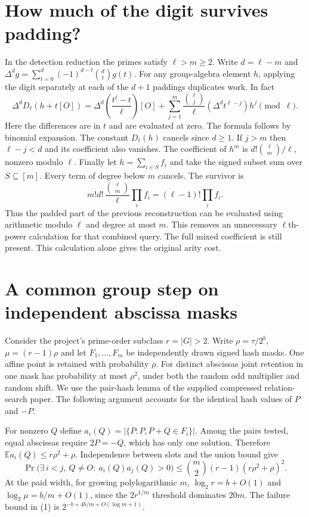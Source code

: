 \documentclass[11pt]{article}
\begin{document}
\section{How much of the digit survives padding?}
In the detection reduction the primes satisfy $\ell>m\ge2$. Write
$d=\ell-m$ and $\Delta^d g=\sum_{t=0}^d(-1)^{d-t}\binom dt g(t)$.
For any group-algebra element $h$, applying the digit separately
at each of the $d+1$ paddings duplicates work. In fact
\[
\Delta^d D_\ell(h+t[O])
 = \Delta^d\!\left(\frac{t^\ell-t}{\ell}\right)[O]
   +\sum_{j=1}^m \frac{\binom{\ell}{j}}{\ell}
                    (\Delta^d t^{\ell-j})h^j \pmod\ell .
\]
Here the differences are in $t$ and are evaluated at zero. The formula
follows by binomial expansion. The constant $D_\ell(h)$ cancels since
$d\ge1$. If $j>m$ then $\ell-j<d$ and its coefficient also vanishes.
The coefficient of $h^m$ is $d!\binom{\ell}{m}/\ell$, nonzero
modulo $\ell$. Finally let $h=\sum_{i\in S}f_i$ and take the signed
subset sum over $S\subseteq[m]$. Every term of degree below $m$
cancels. The survivor is
\[
   m!d!\,\frac{\binom{\ell}{m}}{\ell}\prod_i f_i
                       =(\ell-1)!\prod_i f_i .
\]
Thus the padded part of the previous reconstruction can be evaluated using
arithmetic modulo $\ell$ and degree at most $m$. This removes an
unnecessary $\ell$th-power calculation for that combined query. The
full mixed coefficient is still present. This calculation alone gives
the original arity cost.

\section{A common group step on independent abscissa masks}
Consider the project's prime-order subclass $r=|G|>2$. Write
$\rho=\tau/2^b$, $\mu=(r-1)\rho$ and let $F_1,\dots,F_m$ be
independently drawn signed hash masks. One affine point is retained
with probability $\rho$. For distinct abscissas joint retention in
one mask has probability at most $\rho^2$, under both the random
odd multiplier and random shift. We use the pair-hash lemma of the
supplied compressed relation-search paper. The following argument
accounts for the identical hash values of $P$ and $-P$.

For nonzero $Q$ define $a_i(Q)=|\{P:P,P+Q\in F_i\}|$. Among
the pairs tested, equal abscissas require $2P=-Q$, which has only
one solution. Therefore $\mathbb E a_i(Q)\le r\rho^2+\rho$.
Independence between slots and the union bound give
\[
 \Pr\big(\exists\,i<j,\ Q\ne O:\ a_i(Q)a_j(Q)>0\big)
       \le \binom{m}{2}(r-1)(r\rho^2+\rho)^2 .                 \tag{1}
\]
At the paid width, for growing polylogarithmic $m$,
$\log_2 r=b+O(1)$ and $\log_2\mu=b/m+O(1)$, since the $2r^{1/m}$
threshold dominates $20m$. The failure bound in (1) is
$2^{-b+4b/m+O(\log m+1)}$.
\end{document}
